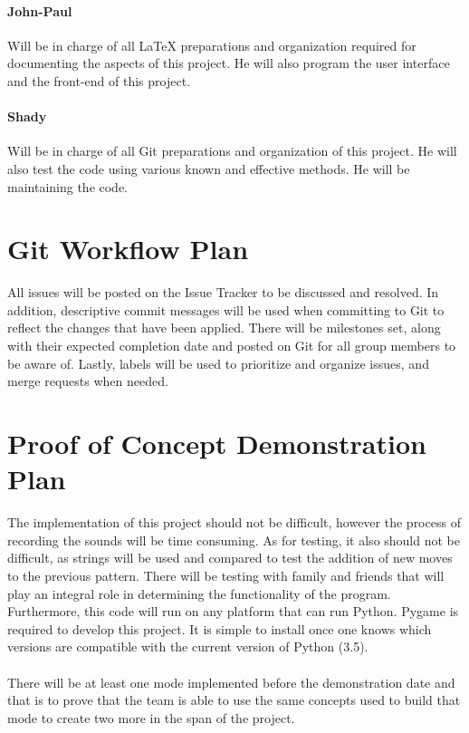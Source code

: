 \documentclass{article}
\begin{document}
\paragraph{John-Paul\\}
Will be in charge of all LaTeX preparations and organization required for documenting the aspects of this project.
He will also program the user interface and the front-end of this project.

\paragraph{Shady\\}
Will be in charge of all Git preparations and organization of this project. He will also test the code using various known and effective
methods. He will be maintaining the code.

\section{Git Workflow Plan}

All issues will be posted on the Issue Tracker to be discussed and resolved. In addition, descriptive commit messages will be used when committing to Git to reflect the changes that have been applied. There will be milestones set, along with their expected completion date and posted on Git for all group members to be aware of. Lastly, labels will be used to prioritize and organize issues, and merge requests when needed.

\section{Proof of Concept Demonstration Plan}

The implementation of this project should not be difficult, however the process of recording the sounds will be time consuming. As for testing, it also should not be difficult, as strings will be used and compared to test the addition of new moves to the previous pattern. There will be testing with family and friends that will play an integral role in determining the functionality of the program. Furthermore, this code will run on any platform that can run Python. Pygame is required to develop this project. It is simple to install once one knows which versions are compatible with the current version of Python (3.5).\\
\\
\indent There will be at least one mode implemented before the demonstration date and that is to prove that the team is able to use the same concepts used to build that mode to create two more in the span of the project.
\end{document}
